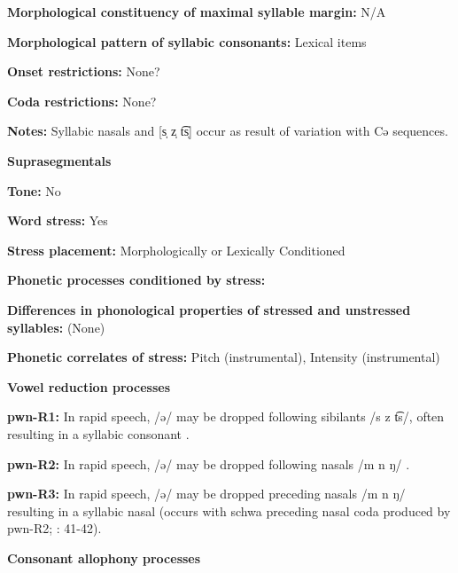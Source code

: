 \textbf{Morphological constituency of maximal syllable margin:} N/A



\textbf{Morphological pattern of syllabic consonants:} Lexical items



\textbf{Onset restrictions:} None?



\textbf{Coda restrictions:} None?



\textbf{Notes:} Syllabic nasals and [s̩ z̩ t͡s̩] occur as result of variation with Cə sequences.



\textbf{Suprasegmentals}



\textbf{Tone:} No



\textbf{Word stress:} Yes



\textbf{Stress placement:} Morphologically or Lexically Conditioned



\textbf{Phonetic processes conditioned by stress:}



\textbf{Differences in phonological properties of stressed and unstressed syllables:} (None)



\textbf{Phonetic correlates of stress:} Pitch (instrumental), Intensity (instrumental)



\textbf{Vowel reduction processes}



\textbf{pwn-R1:} In rapid speech, /ə/ may be dropped following sibilants /s z t͡s/, often resulting in a syllabic consonant \citep[40-41]{Chang2006}.



\textbf{pwn-R2:} In rapid speech, /ə/ may be dropped following nasals /m n ŋ/ \citep[41]{Chang2006}.



\textbf{pwn-R3:} In rapid speech, /ə/ may be dropped preceding nasals /m n ŋ/ resulting in a syllabic nasal (occurs with schwa preceding nasal coda produced by pwn-R2; \citealt{Chang2006}: 41-42).



\textbf{Consonant allophony processes}



